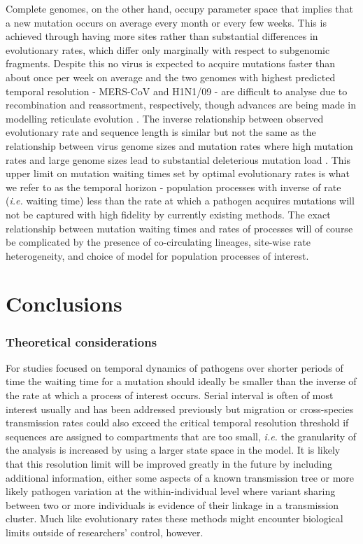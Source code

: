 \documentclass{bmcart}
\begin{document}
Complete genomes, on the other hand, occupy parameter space that implies that a new mutation occurs on average every month or every few weeks.
This is achieved through having more sites rather than substantial differences in evolutionary rates, which differ only marginally with respect to subgenomic fragments.
Despite this no virus is expected to acquire mutations faster than about once per week on average and the two genomes with highest predicted temporal resolution - MERS-CoV and H1N1/09 - are difficult to analyse due to recombination and reassortment, respectively, though advances are being made in modelling reticulate evolution \cite{vaughan_inferring_2017}.
The inverse relationship between observed evolutionary rate and sequence length is similar but not the same as the relationship between virus genome sizes and mutation rates where high mutation rates and large genome sizes lead to substantial deleterious mutation load \cite{gago_extremely_2009}.
This upper limit on mutation waiting times set by optimal evolutionary rates is what we refer to as the temporal horizon - population processes with inverse of rate (\textit{i.e.} waiting time) less than the rate at which a pathogen acquires mutations will not be captured with high fidelity by currently existing methods.
The exact relationship between mutation waiting times and rates of processes will of course be complicated by the presence of co-circulating lineages, site-wise rate heterogeneity, and choice of model for population processes of interest.

\section*{Conclusions}
\subsubsection*{Theoretical considerations}
For studies focused on temporal dynamics of pathogens over shorter periods of time the waiting time for a mutation should ideally be smaller than the inverse of the rate at which a process of interest occurs.
Serial interval is often of most interest usually and has been addressed previously \cite{campbell_when_2018,grubaugh_tracking_2019} but migration or cross-species transmission rates could also exceed the critical temporal resolution threshold if sequences are assigned to compartments that are too small, \textit{i.e.} the granularity of the analysis is increased by using a larger state space in the model.
It is likely that this resolution limit will be improved greatly in the future by including additional information, either some aspects of a known transmission tree or more likely pathogen variation at the within-individual level where variant sharing between two or more individuals is evidence of their linkage in a transmission cluster.
Much like evolutionary rates these methods might encounter biological limits outside of researchers' control, however.
\end{document}
